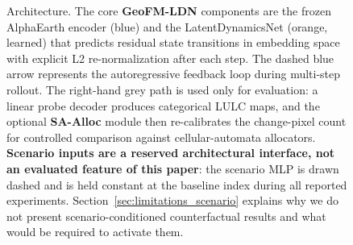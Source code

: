 \documentclass{article}
\begin{document}
\begin{figure}[htbp]
{
}
\caption{Architecture. The core \textbf{GeoFM-LDN} components are the frozen AlphaEarth encoder (blue) and the LatentDynamicsNet (orange, learned) that predicts residual state transitions in embedding space with explicit L2 re-normalization after each step. The dashed blue arrow represents the autoregressive feedback loop during multi-step rollout. The right-hand grey path is used only for evaluation: a linear probe decoder produces categorical LULC maps, and the optional \textbf{SA-Alloc} module then re-calibrates the change-pixel count for controlled comparison against cellular-automata allocators. \textbf{Scenario inputs are a reserved architectural interface, not an evaluated feature of this paper}: the scenario MLP is drawn dashed and is held constant at the baseline index during all reported experiments. Section~\ref{sec:limitations_scenario} explains why we do not present scenario-conditioned counterfactual results and what would be required to activate them.}
\label{fig:architecture}
\end{figure}
\end{document}
